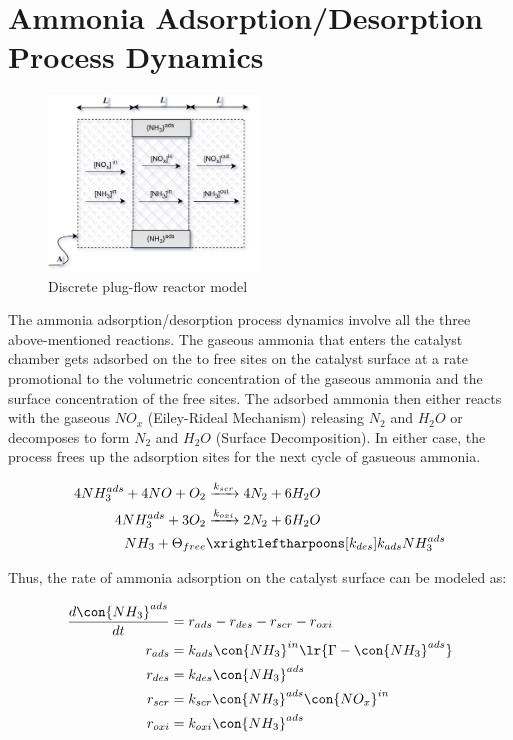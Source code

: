 \newpage
\section{Ammonia Adsorption/Desorption Process Dynamics}

\begin{figure}[H]
    \centering
    \includegraphics[width=0.5\textwidth]{./figs/scr_sys/plug_flow_discrete.png}
    \caption{Discrete plug-flow reactor model}
    \label{fig:plug_flow_discrete}
\end{figure}


The ammonia adsorption/desorption process dynamics involve all the three
above-mentioned reactions. The gaseous ammonia that enters the catalyst chamber
gets adsorbed on the to free sites on the catalyst surface at a rate
promotional to the volumetric concentration of the gaseous ammonia and the
surface concentration of the free sites. The adsorbed ammonia then either reacts
with the gaseous $NO_x$ (Eiley-Rideal Mechanism) releasing $N_2$ and $H_2O$ or
decomposes to form $N_2$ and $H_2O$ (Surface Decomposition). In either
case, the process frees up the adsorption sites for the next cycle of gasueous ammonia.

\begin{align}
    4 NH_3 ^{ads} + 4 NO + O_2 &\xrightarrow[]{k_{scr}} 4 N_2 + 6 H_2O \\
    4 NH_3^{ads} + 3 O_2 &\xrightarrow[]{k_{oxi}} 2 N_2 + 6 H_2O \\
    NH_3 + \Theta_{free} &\xrightleftharpoons[k_{des}]{k_{ads}} NH_3^{ads}
\end{align}


Thus, the rate of ammonia adsorption on the catalyst surface can be modeled as:

\begin{align}
    \frac{d \con{NH_3}^{ads}}{dt} &= r_{ads} - r_{des} - r_{scr} - r_{oxi}\\
    r_{ads} &= k_{ads} \con{NH_3}^{in} \lr{\Gamma - \con{NH_3}^{ads}}\\
    r_{des} &= k_{des} \con{NH_3}^{ads}\\
    r_{scr} &= k_{scr} \con{NH_3}^{ads} \con{NO_x}^{in}\\
    r_{oxi} &= k_{oxi} \con{NH_3}^{ads}
\end{align}


